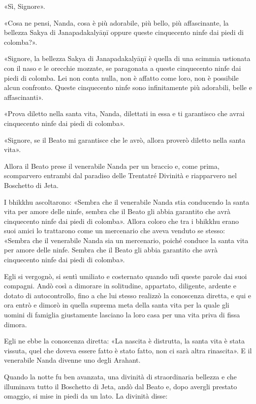 «Sì, Signore».


«Cosa ne pensi, Nanda, cosa è più adorabile, più bello, più
affascinante, la bellezza Sakya di Janapadakalyāṇī oppure queste
cinquecento ninfe dai piedi di colomba?».


«Signore, la bellezza Sakya di Janapadakalyāṇī è quella di una scimmia
ustionata con il naso e le orecchie mozzate, se paragonata a queste
cinquecento ninfe dai piedi di colomba. Lei non conta nulla, non è
affatto come loro, non è possibile alcun confronto. Queste cinquecento
ninfe sono infinitamente più adorabili, belle e affascinanti».


«Prova diletto nella santa vita, Nanda, dilettati in essa e ti
garantisco che avrai cinquecento ninfe dai piedi di colomba».


«Signore, se il Beato mi garantisce che le avrò, allora proverò diletto
nella santa vita».


Allora il Beato prese il venerabile Nanda per un braccio e, come prima,
scomparvero entrambi dal paradiso delle Trentatré Divinità e riapparvero
nel Boschetto di Jeta.


I bhikkhu ascoltarono: «Sembra che il venerabile Nanda stia conducendo
la santa vita per amore delle ninfe, sembra che il Beato gli abbia
garantito che avrà cinquecento ninfe dai piedi di colomba». Allora
coloro che tra i bhikkhu erano suoi amici lo trattarono come un
mercenario che aveva venduto se stesso: «Sembra che il venerabile Nanda
sia un mercenario, poiché conduce la santa vita per amore delle ninfe.
Sembra che il Beato gli abbia garantito che avrà cinquecento ninfe dai
piedi di colomba».


Egli si vergognò, si sentì umiliato e costernato quando udì queste
parole dai suoi compagni. Andò così a dimorare in solitudine, appartato,
diligente, ardente e dotato di autocontrollo, fino a che lui stesso
realizzò la conoscenza diretta, e qui e ora entrò e dimorò in quella
suprema meta della santa vita per la quale gli uomini di famiglia
giustamente lasciano la loro casa per una vita priva di fissa dimora.


Egli ne ebbe la conoscenza diretta: «La nascita è distrutta, la santa vita è stata vissuta, quel che doveva
essere fatto è stato fatto, non ci sarà altra rinascita». E il
venerabile Nanda divenne uno degli Arahant.


Quando la notte fu ben avanzata, una divinità di straordinaria bellezza
e che illuminava tutto il Boschetto di Jeta, andò dal Beato e, dopo
avergli prestato omaggio, si mise in piedi da un lato.
La divinità disse:



